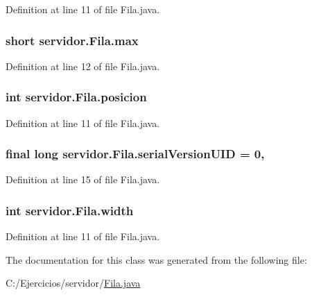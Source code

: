 Definition at line 11 of file Fila.\+java.

\subsubsection[{\texorpdfstring{max}{max}}]{\setlength{\rightskip}{0pt plus 5cm}short servidor.\+Fila.\+max\hspace{0.3cm}{\ttfamily [private]}}\hypertarget{classservidor_1_1Fila_aa8821727301f09d86b881714d7824fa8}{}\label{classservidor_1_1Fila_aa8821727301f09d86b881714d7824fa8}


Definition at line 12 of file Fila.\+java.

\subsubsection[{\texorpdfstring{posicion}{posicion}}]{\setlength{\rightskip}{0pt plus 5cm}int servidor.\+Fila.\+posicion\hspace{0.3cm}{\ttfamily [private]}}\hypertarget{classservidor_1_1Fila_a57f83b01118720d2e7e4abae6e79444c}{}\label{classservidor_1_1Fila_a57f83b01118720d2e7e4abae6e79444c}


Definition at line 11 of file Fila.\+java.

\subsubsection[{\texorpdfstring{serial\+Version\+U\+ID}{serialVersionUID}}]{\setlength{\rightskip}{0pt plus 5cm}final long servidor.\+Fila.\+serial\+Version\+U\+ID = 0\hspace{0.3cm}{\ttfamily [static]}, {\ttfamily [package]}}\hypertarget{classservidor_1_1Fila_a14a142adc5c71e953428bbcaa8d82ea6}{}\label{classservidor_1_1Fila_a14a142adc5c71e953428bbcaa8d82ea6}


Definition at line 15 of file Fila.\+java.

\subsubsection[{\texorpdfstring{width}{width}}]{\setlength{\rightskip}{0pt plus 5cm}int servidor.\+Fila.\+width\hspace{0.3cm}{\ttfamily [package]}}\hypertarget{classservidor_1_1Fila_a5d6c08f920ba4ef0fc26ace09ff0ead1}{}\label{classservidor_1_1Fila_a5d6c08f920ba4ef0fc26ace09ff0ead1}


Definition at line 11 of file Fila.\+java.



The documentation for this class was generated from the following file\+:\begin{DoxyCompactItemize}
\item 
C\+:/\+Ejercicios/servidor/\hyperlink{Fila_8java}{Fila.\+java}\end{DoxyCompactItemize}
